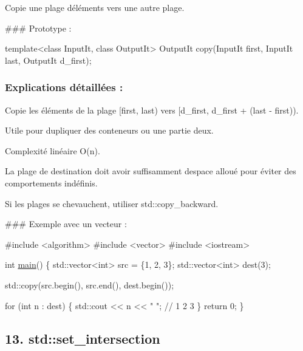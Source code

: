 Copie une plage d\textquotesingle{}éléments vers une autre plage.

\#\#\# Prototype \+: 
\begin{DoxyCode}
\textcolor{keyword}{template}<\textcolor{keyword}{class} InputIt, \textcolor{keyword}{class} OutputIt>
OutputIt copy(InputIt first, InputIt last, OutputIt d\_first);
\end{DoxyCode}


\subsubsection*{Explications détaillées \+:}


\begin{DoxyItemize}
\item Copie les éléments de la plage {\ttfamily \mbox{[}first, last)} vers {\ttfamily \mbox{[}d\+\_\+first, d\+\_\+first + (last -\/ first))}.
\item Utile pour dupliquer des conteneurs ou une partie d\textquotesingle{}eux.
\item Complexité linéaire O(n).
\item La plage de destination doit avoir suffisamment d\textquotesingle{}espace alloué pour éviter des comportements indéfinis.
\item Si les plages se chevauchent, utiliser {\ttfamily std\+::copy\+\_\+backward}.
\end{DoxyItemize}

\#\#\# Exemple avec un vecteur \+: 
\begin{DoxyCode}
\textcolor{preprocessor}{#include <algorithm>}
\textcolor{preprocessor}{#include <vector>}
\textcolor{preprocessor}{#include <iostream>}

\textcolor{keywordtype}{int} \hyperlink{htop_8c_a3c04138a5bfe5d72780bb7e82a18e627}{main}() \{
    std::vector<int> src = \{1, 2, 3\};
    std::vector<int> dest(3);

    std::copy(src.begin(), src.end(), dest.begin());

    \textcolor{keywordflow}{for} (\textcolor{keywordtype}{int} n : dest) \{
        std::cout << n << \textcolor{stringliteral}{" "}; \textcolor{comment}{// 1 2 3}
    \}
    \textcolor{keywordflow}{return} 0;
\}
\end{DoxyCode}
 



\subsection*{13. {\bfseries std\+::set\+\_\+intersection}}

